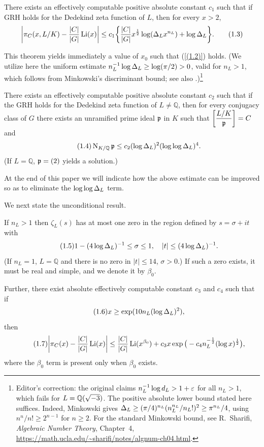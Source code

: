 \documentclass[./main]{subfiles}
\begin{document}
\begin{theorem} \label{1.1}
There exists an effectively computable positive absolute constant $c_1$ such that if GRH holds for the Dedekind zeta function of $L$, then for every $x>2$, 
\[ \bigg| \pi_C(x, L/K) - \frac{|C|}{|G|} \operatorname{Li}(x) \bigg| \le c_1 \bigg\{ \frac{|C|}{|G|} x^{\frac{1}{2}} \log(\Delta_L x^{n_L}) + \log \Delta_L \bigg\}.\tag{1.3} \label{(1.3)} \]
\end{theorem}

This theorem yields immediately a value of $x_0$ such that (\ref{(1.2)}) holds. (We utilize here the uniform estimate $n_L^{-1}\log\Delta_L \geq \log(\pi/2)>0$, valid for $n_L>1$, which follows from Minkowski's discriminant bound; see also \cite{11-odlyzko1977}.)\footnote{Editor's correction: the original claims $n_L^{-1}\log d_L>1+\varepsilon$ for all $n_L>1$, which fails for $L=\mathbb{Q}(\sqrt{-3})$. The positive absolute lower bound stated here suffices. Indeed, Minkowski gives $\Delta_L\geq(\pi/4)^{n_L}(n_L^{n_L}/n_L!)^2\geq\pi^{n_L}/4$, using $n^n/n!\geq2^{n-1}$ for $n\geq2$. For the standard Minkowski bound, see R.~Sharifi, \emph{Algebraic Number Theory}, Chapter~4, \url{https://math.ucla.edu/~sharifi/notes/algnum-ch04.html}.}

\begin{corollary} \label{1.2}
There exists an effectively computable positive absolute constant $c_2$ such that if the GRH holds for the Dedekind zeta function of $L \ne \mathbb Q$, then for every conjugacy class of $G$ there exists an unramified prime ideal $\mathfrak{p}$ in $K$ such that $\bigg[\dfrac{L/K}{\mathfrak{p}}\bigg] = C$ and 
\[ \tag{1.4}\label{(1.4)} \operatorname{N}_{K/\mathbb Q} \mathfrak{p} \le c_2(\log \Delta_L)^2 (\log \log \Delta_L)^4. \]
(If $L = \mathbb Q$, $\mathfrak{p} = (2)$ yields a solution.)
\end{corollary}


At the end of this paper we will indicate how the above estimate can be improved so as to eliminate the $\log \log \Delta_L$ term.

We next state the unconditional result.

\begin{theorem} \label{1.3}
If $n_L > 1$ then $\zeta_L(s)$ has at most one zero in the region defined by $s = \sigma +it$  with 
\[ \tag{1.5}\label{(1.5)} 1 - (4\log\Delta_L)^{-1} \le \sigma \le 1, \hspace{1em} |t| \le (4\log\Delta_L)^{-1}. \]
(If $n_L = 1$, $L = \mathbb Q$ and there is no zero in $|t| \le 14$, $\sigma > 0$.)
\newline If such a zero exists, it must be real and simple, and we denote it by $\beta_0$. 

Further, there exist absolute effectively computable constant $c_3$ and $c_4$ such that if
\[ \tag{1.6}\label{(1.6)} x\ge \exp (10 n_L (\log \Delta_L)^2 ), \]
then
\[ \tag{1.7}\label{(1.7)}
    \bigg| \pi_C (x) - \frac{|C|}{|G|} \operatorname{Li}(x) \bigg| \le \frac{|C|}{|G|} \operatorname{Li} (x^{\beta_0}) + c_3x \exp \big(-c_4n_L^{-\frac{1}{2}}(\log x)^{\frac 12}\big),
\]
where the $\beta_0$ term is present only when $\beta_0$ exists.
\end{theorem}
\end{document}
